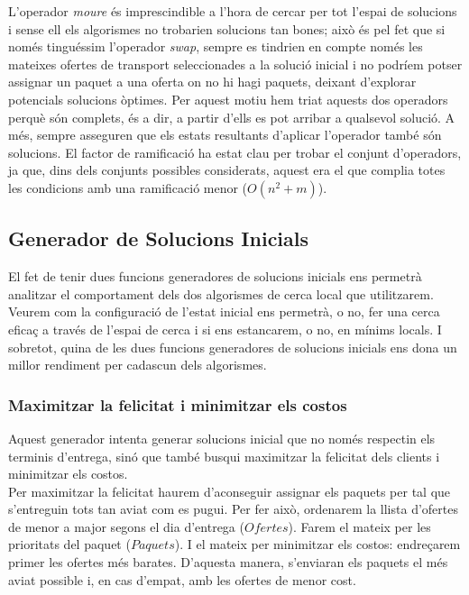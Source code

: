 \documentclass[a4paper]{article}
\begin{document}
	L'operador \textit{moure} és imprescindible a l'hora de cercar per tot l'espai de solucions i sense ell els algorismes no trobarien solucions tan bones; això és pel fet que si només tinguéssim l'operador \textit{swap}, sempre es tindrien en compte només les mateixes ofertes de transport seleccionades a la solució inicial i no podríem potser assignar un paquet a una oferta on no hi hagi paquets, deixant d'explorar potencials solucions òptimes. Per aquest motiu hem triat aquests dos operadors perquè són complets, és a dir, a partir d'ells es pot arribar a qualsevol solució. A més, sempre asseguren que els estats resultants d'aplicar l'operador també són solucions. El factor de ramificació ha estat clau per trobar el conjunt d'operadors, ja que, dins dels conjunts possibles considerats, aquest era el que complia totes les condicions amb una ramificació menor ($O(n^2+m)$). \\
	
	\subsection{Generador de Solucions Inicials}
	
	El fet de tenir dues funcions generadores de solucions inicials ens permetrà analitzar el comportament dels dos algorismes de cerca local que utilitzarem. Veurem com la configuració de l'estat inicial ens permetrà, o no, fer una cerca eficaç a través de l'espai de cerca i si ens estancarem, o no, en mínims locals. I sobretot, quina de les dues funcions generadores de solucions inicials ens dona un millor rendiment per cadascun dels algorismes.
	
	\subsubsection{Maximitzar la felicitat i minimitzar els costos}
	\label{sec:GenSolIni_felicitat}
	
	Aquest generador intenta generar solucions inicial que no només respectin els terminis d'entrega, sinó que també busqui maximitzar la felicitat dels clients i minimitzar els costos. \\
	
	Per maximitzar la felicitat haurem d'aconseguir assignar els paquets per tal que s'entreguin tots tan aviat com es pugui. Per fer això, ordenarem la llista d'ofertes de menor a major segons el dia d'entrega ($Ofertes$). Farem el mateix per les prioritats del paquet ($Paquets$). I el mateix per minimitzar els costos: endreçarem primer les ofertes més barates. D'aquesta manera, s'enviaran els paquets el més aviat possible i, en cas d'empat, amb les ofertes de menor cost. \\
	
\end{document}

